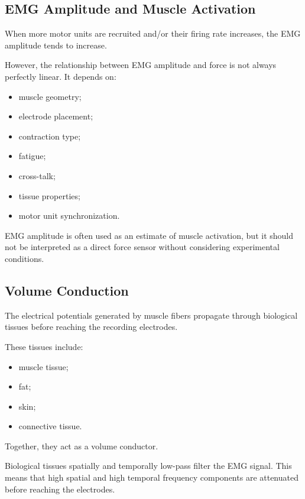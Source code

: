 \subsection{EMG Amplitude and Muscle Activation}

When more motor units are recruited and/or their firing rate increases, the EMG amplitude tends to increase.

However, the relationship between EMG amplitude and force is not always perfectly linear. It depends on:

\begin{itemize}[noitemsep]
    \item muscle geometry;
    \item electrode placement;
    \item contraction type;
    \item fatigue;
    \item cross-talk;
    \item tissue properties;
    \item motor unit synchronization.
\end{itemize}

\begin{authornote}
EMG amplitude is often used as an estimate of muscle activation, but it should not be interpreted as a direct force sensor without considering experimental conditions.
\end{authornote}

\subsection{Volume Conduction}

The electrical potentials generated by muscle fibers propagate through biological tissues before reaching the recording electrodes.

These tissues include:

\begin{itemize}[noitemsep]
    \item muscle tissue;
    \item fat;
    \item skin;
    \item connective tissue.
\end{itemize}

Together, they act as a volume conductor.

Biological tissues spatially and temporally low-pass filter the EMG signal. This means that high spatial and high temporal frequency components are attenuated before reaching the electrodes.

